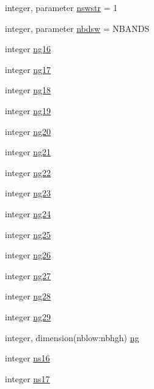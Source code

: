 \begin{DoxyCompactItemize}
integer, parameter \hyperlink{group__module__radsw__main_ga3d4238ce9a40d70a6cdfe241d640ff5f}{nswstr} = 1
\item 
integer, parameter \hyperlink{group__module__radsw__main_gab1e121fde29dde00871e4a7d43be1ddb}{nbdsw} = N\+B\+A\+N\+DS
\item 
integer \hyperlink{group__module__radsw__main_ga442b3758f00a388cd8b7129ba910942a}{ng16}
\item 
integer \hyperlink{group__module__radsw__main_gaf1f90ffe5780463d1e2edbe0e8dfd1f9}{ng17}
\item 
integer \hyperlink{group__module__radsw__main_gac00a8e59e4f7e584af9b453c2c9fe35d}{ng18}
\item 
integer \hyperlink{group__module__radsw__main_gab3551e23105cd3515e887e877407dc39}{ng19}
\item 
integer \hyperlink{group__module__radsw__main_ga1619a2243f1cb29e4393598fa0bc4c8f}{ng20}
\item 
integer \hyperlink{group__module__radsw__main_gab029caf0ee0c1195539643bef00e0598}{ng21}
\item 
integer \hyperlink{group__module__radsw__main_ga655c1f742fc97d58c32131e8a85cb6fd}{ng22}
\item 
integer \hyperlink{group__module__radsw__main_ga0c4f1d2f9438850994bcedb395d07f40}{ng23}
\item 
integer \hyperlink{group__module__radsw__main_gae25ce9a47816b83c6c57440747f1975f}{ng24}
\item 
integer \hyperlink{group__module__radsw__main_ga3361783dd00dc40ee9f93c7f428c4e58}{ng25}
\item 
integer \hyperlink{group__module__radsw__main_gafcc02ded0358f9465eb9987226522266}{ng26}
\item 
integer \hyperlink{group__module__radsw__main_ga56a6dfca4ad450a5ccc910864780a971}{ng27}
\item 
integer \hyperlink{group__module__radsw__main_gaa2530abff6c981c3f3e70ef097f90ffc}{ng28}
\item 
integer \hyperlink{group__module__radsw__main_gaa53b1af0366b40653a6f0868858b9f3d}{ng29}
\item 
integer, dimension(nblow\+:nbhgh) \hyperlink{group__module__radsw__main_gaff9670cd3f5bef92ca998e491e28986e}{ng}
\item 
integer \hyperlink{group__module__radsw__main_ga3e6e310ecc531e2d0db52864468dc4a7}{ns16}
\item 
integer \hyperlink{group__module__radsw__main_ga08303e69e406f6bb2af252b1b7dff272}{ns17}
\item 

\end{DoxyCompactItemize}
